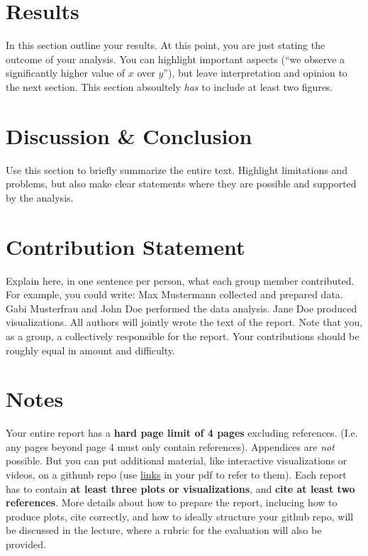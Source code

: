 \documentclass{article}
\theoremstyle{plain}
\theoremstyle{definition}
\theoremstyle{remark}
\begin{document}
\section{Results}\label{sec:results}

In this section outline your results. At this point, you are just stating the outcome of your analysis. 
You can highlight important aspects (``we observe a significantly higher value of $x$ over $y$''), but leave interpretation and opinion to the next section. This section absoultely \emph{has} to include at least two figures.

\section{Discussion \& Conclusion}\label{sec:conclusion}

Use this section to briefly summarize the entire text. Highlight limitations and problems, but also make clear statements where they are possible and supported by the analysis. 

\section*{Contribution Statement}

Explain here, in one sentence per person, what each group member contributed. For example, you could write: Max Mustermann collected and prepared data. Gabi Musterfrau and John Doe performed the data analysis. Jane Doe produced visualizations. All authors will jointly wrote the text of the report. Note that you, as a group, a collectively responsible for the report. Your contributions should be roughly equal in amount and difficulty.

\section*{Notes} 

Your entire report has a \textbf{hard page limit of 4 pages} excluding references. (I.e. any pages beyond page 4 must only contain references). Appendices are \emph{not} possible. But you can put additional material, like interactive visualizations or videos, on a githunb repo (use \href{https://github.com/pnkraemer/tueplots}{links} in your pdf to refer to them). Each report has to contain \textbf{at least three plots or visualizations}, and \textbf{cite at least two references}. More details about how to prepare the report, inclucing how to produce plots, cite correctly, and how to ideally structure your github repo, will be discussed in the lecture, where a rubric for the evaluation will also be provided.




\end{document}
